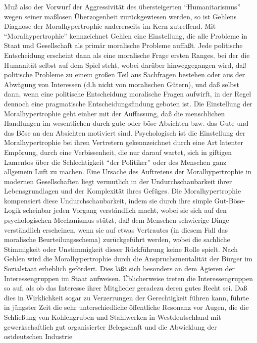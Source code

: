 \documentclass[12pt,a4paper]{article}
\begin{document}
Muß also der Vorwurf der Aggressivität des übersteigerten "`Humanitarismus"'
wegen seiner maßlosen Überzogenheit zurückgewiesen werden, so ist Gehlens
Diagnose der Moralhypertrophie andererseits im Kern zutreffend.  Mit
"`Moralhypertrophie"' kennzeichnet Gehlen eine Einstellung, die alle Probleme
in Staat und Gesellschaft als primär moralische Probleme auffaßt. Jede
politische Entscheidung erscheint dann als eine moralische Frage ersten
Ranges, bei der die Humanität selbst auf dem Spiel steht, wobei darüber
hinweggegangen wird, daß politische Probleme zu einem großen Teil aus
Sachfragen bestehen oder aus der Abwägung von Interessen (d.h nicht von
moralischen Gütern), und daß selbst dann, wenn eine politische Entscheidung
moralische Fragen aufwirft, in der Regel dennoch eine pragmatische
Entscheidungsfindung geboten ist. Die Einstellung der Moralhypertrophie geht
einher mit der Auffassung, daß die menschlichen Handlungen im wesentlichen
durch gute oder böse Absichten bzw. das Gute und das Böse an den Absichten
motiviert sind. Psychologisch ist die Einstellung der Moralhypertrophie bei
ihren Vertretern gekennzeichnet durch eine Art latenter Empörung, durch eine
Verbissenheit, die nur darauf wartet, sich in giftigen Lamentos über die
Schlechtigkeit "`der Politiker"' oder des Menschen ganz allgemein Luft zu
machen. Eine Ursache des Auftretens der Moralhypertrophie in modernen
Gesellschaften liegt vermutlich in der Undurchschaubarkeit ihrer
Lebensgrundlagen und der Komplexität ihres Gefüges. Die Moralhypertrophie
kompensiert diese Undurchschaubarkeit, indem sie durch ihre simple
Gut-Böse-Logik scheinbar jeden Vorgang verständlich macht, wobei sie sich auf
den psychologischen Mechanismus stützt, daß dem Menschen schwierige Dinge
verständlich erscheinen, wenn sie auf etwas Vertrautes (in diesem Fall das
moralische Beurteilungsschema) zurückgeführt werden, wobei die sachliche
Stimmigkeit oder Unstimmigkeit dieser Rückführung keine Rolle spielt. Nach
Gehlen wird die Moralhypertrophie durch die Anspruchsmentalität der Bürger im
Sozialstaat erheblich gefördert. Dies läßt sich besonders an dem Agieren der
Interessengruppen im Staat aufweisen. Üblicherweise treten die
Interessengruppen so auf, als ob das Interesse ihrer Mitglieder geradezu deren
gutes Recht sei. Daß dies in Wirklichkeit sogar zu Verzerrungen der
Gerechtigkeit führen kann, führte in jüngster Zeit die sehr unterschiedliche
öffentliche Resonanz vor Augen, die die Schließung von Kohlengruben und
Stahlwerken in Westdeutschland mit gewerkschaftlich gut organisierter
Belegschaft und die Abwicklung der ostdeutschen Industrie
\end{document}
